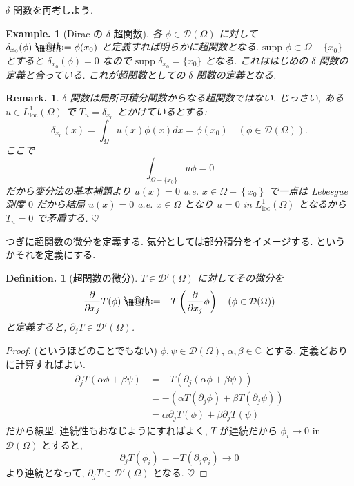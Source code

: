 \documentclass[openany, a4paper, oneside]{book}
\makeatletter
\newcommand*{\defeq}{\mathrel{\rlap{%
\raisebox{0.3ex}{$\m@th\cdot$}}%
\raisebox{-0.3ex}{$\m@th\cdot$}}%
=}
\theoremstyle{break}
\theoremstyle{breakdefn}
\newtheorem{defn}[thm]{Definition.}
\newtheorem{ex}[thm]{Example.}
\newtheorem{rem}[thm]{Remark.}
\newcommand{\rbk}[1]{\left (#1\right)}
\newcommand{\cbk}[1]{\left\{#1\right\}}
\newcommand{\Loneloc}{L_{\mathrm{loc}}^1}
\newcommand{\supp}{\mathrm{supp} \,}
\makeatother
\begin{document}
$\delta$ 関数を再考しよう.
\begin{ex}[Dirac の $\delta$ 超関数]
 各 $\phi \in \mathcal{D}(\Omega)$ に対して
 $\delta_{x_0}(\phi) \defeq \phi (x_0)$ と定義すれば明らかに超関数となる.
 $\supp \, \phi \subset \Omega - \{x_0\}$ とすると
 $\delta_{x_0}(\phi) = 0$ なので $\supp \, \delta_{x_0} = \{ x_0 \}$ となる.
 これははじめの $\delta$ 関数の定義と合っている.
 これが超関数としての $\delta$ 関数の定義となる.
\end{ex}
\begin{rem}
 $\delta$ 関数は局所可積分関数からなる超関数ではない.
 じっさい, ある $u \in \Loneloc (\Omega)$ で $T_u = \delta_{x_0}$ とかけているとする:
 \begin{equation}
  \delta_{x_0}(x)
  =
  \int_{\Omega}u (x)\phi (x) dx
  =
  \phi (x_0) \quad (\phi \in \mathcal{D}(\Omega)).
 \end{equation}
 ここで
 \begin{equation}
  \int_{\Omega - \{x_0\}}u\phi
  =
  0
 \end{equation}
 だから変分法の基本補題より $u (x) = 0$ a.e. $x \in \Omega - \cbk{x_0}$ で一点は
 Lebesgue 測度 $0$ だから結局 $u (x) = 0$ a.e. $x \in \Omega$ となり
 $u = 0 $ in $\Loneloc (\Omega)$ となるから $T_u = 0$ で矛盾する.
 $\heartsuit$
\end{rem}

つぎに超関数の微分を定義する.
気分としては部分積分をイメージする.
というかそれを定義にする.
\begin{defn}[超関数の微分]
 $T \in \mathcal{D}'(\Omega)$ に対してその微分を
 \begin{equation}
  \frac{\partial}{\partial x_j}T (\phi)
  \defeq
  -T \rbk{\frac{\partial}{\partial x_j}\phi} \quad (\phi \in \mathcal{D}(\Omega))
 \end{equation}
 と定義すると, $\partial_j T \in \mathcal{D}'(\Omega)$.
\end{defn}
\begin{proof}(というほどのことでもない)
$\phi, \psi \in \mathcal{D}(\Omega)$, $\alpha, \beta \in \mathbb{C}$ とする.
定義どおりに計算すればよい.
\begin{equation}
 \begin{split}
  \partial_j T (\alpha \phi + \beta \psi)
  &=
  -T (\partial_j (\alpha \phi + \beta \psi)) \\
  &=
  -(\alpha T (\partial_j\phi) + \beta T (\partial_j\psi)) \\
  &=
  \alpha \partial_jT (\phi) + \beta \partial_jT (\psi)
 \end{split}
\end{equation}
だから線型.
連続性もおなじようにすればよく, $T$ が連続だから $\phi_i \to 0$ in $\mathcal{D}(\Omega)$ とすると,
\begin{equation}
 \partial_jT (\phi_i)
 =
 -T (\partial_j \phi_i) \to 0
\end{equation}
より連続となって, $\partial_j T \in \mathcal{D}'(\Omega)$ となる.
$\heartsuit$
\end{proof}
\end{document}
